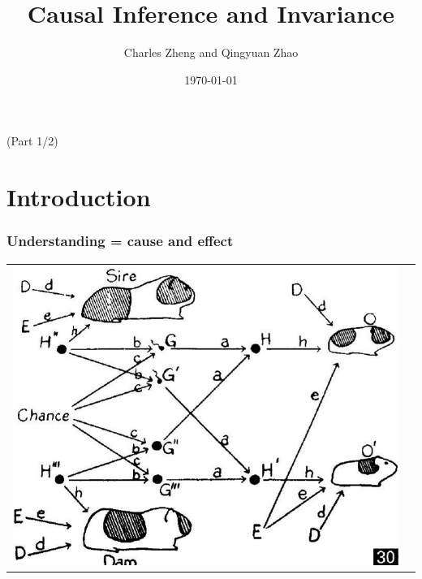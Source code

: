 \documentclass{beamer}
\title[Informal]{Causal Inference and Invariance}
\author{Charles Zheng and Qingyuan Zhao}
\institute[Stanford]
{Stanford University}
\date{\today}
\begin{document}
\begin{frame}
\titlepage
(Part 1/2)
\end{frame}












\section{Introduction}

\begin{frame}
\frametitle{Understanding = cause and effect}
\begin{tabular}{cc}
\includegraphics[scale=0.13]{../images/pearl30.png}& \\

\end{tabular}
\end{frame}
\end{document}
